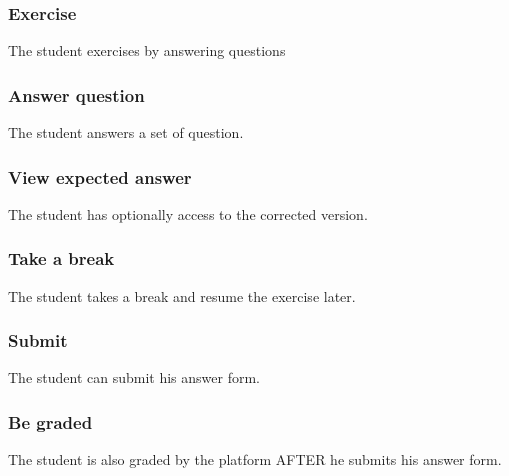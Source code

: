 		\subsubsection{Exercise}
			The student exercises by answering questions
		\subsubsection{Answer question}
			The student answers a set of question.
		\subsubsection{View expected answer}
			The student has optionally access to the corrected version.
		\subsubsection{Take a break}
			The student takes a break and resume the exercise later.
		\subsubsection{Submit}
			The student can submit his answer form.
		\subsubsection{Be graded}
			The student is also graded by the platform AFTER he submits his answer form.		
